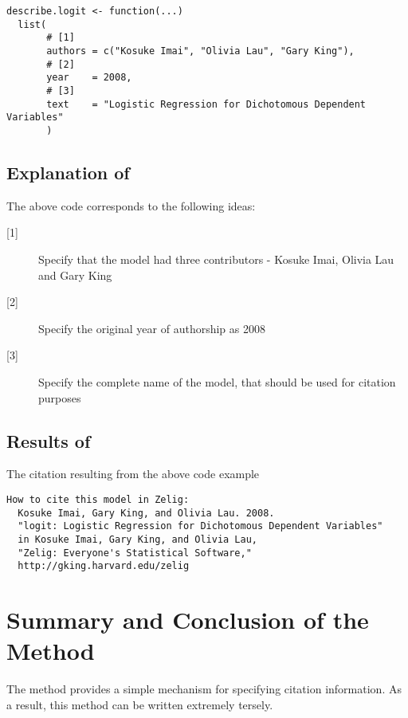 \begin{verbatim}
describe.logit <- function(...)
  list(
       # [1]
       authors = c("Kosuke Imai", "Olivia Lau", "Gary King"),
       # [2]
       year    = 2008,
       # [3]
       text    = "Logistic Regression for Dichotomous Dependent Variables"
       )
\end{verbatim}


\subsection{Explanation of }

The above code corresponds to the following ideas:

\begin{description}
  \item[{[1]}] Specify that the model had three contributors - Kosuke Imai, Olivia Lau and Gary King
  \item[{[2]}] Specify the original year of authorship as 2008
  \item[{[3]}] Specify the complete name of the model, that should be used for citation purposes
\end{description}


%
\subsection{Results of }

The citation resulting from the above code example

\begin{verbatim}
How to cite this model in Zelig:
  Kosuke Imai, Gary King, and Olivia Lau. 2008.
  "logit: Logistic Regression for Dichotomous Dependent Variables"
  in Kosuke Imai, Gary King, and Olivia Lau,
  "Zelig: Everyone's Statistical Software,"
  http://gking.harvard.edu/zelig
\end{verbatim}

\section{Summary and Conclusion of the  Method}

The  method provides a simple mechanism for specifying citation information. As a result, this method can be written extremely tersely.
